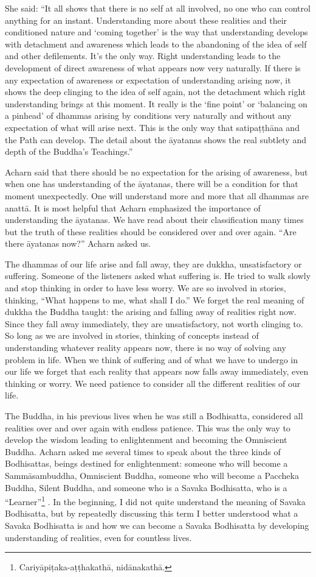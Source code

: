 She said: ``It all shows that there is no self at all involved, no one
who can control anything for an instant. Understanding more about these
realities and their conditioned nature and `coming together' is the way
that understanding develops with detachment and awareness which leads to
the abandoning of the idea of self and other defilements. It's the only
way. Right understanding leads to the development of direct awareness of
what appears now very naturally. If there is any expectation of
awareness or expectation of understanding arising now, it shows the deep
clinging to the idea of self again, not the detachment which right
understanding brings at this moment. It really is the `fine point' or
`balancing on a pinhead' of dhammas arising by conditions very naturally
and without any expectation of what will arise next. This is the only
way that satipaṭṭhāna and the Path can develop. The detail about the
āyatanas shows the real subtlety and depth of the Buddha's Teachings.''

Acharn said that there should be no expectation for the arising of
awareness, but when one has understanding of the āyatanas, there will be
a condition for that moment unexpectedly. One will understand more and
more that all dhammas are anattā. It is most helpful that Acharn
emphasized the importance of understanding the āyatanas. We have read
about their classification many times but the truth of these realities
should be considered over and over again. ``Are there āyatanas now?''
Acharn asked us.

The dhammas of our life arise and fall away, they are dukkha,
unsatisfactory or suffering. Someone of the listeners asked what
suffering is. He tried to walk slowly and stop thinking in order to have
less worry. We are so involved in stories, thinking, ``What happens to
me, what shall I do.'' We forget the real meaning of dukkha the Buddha
taught: the arising and falling away of realities right now. Since they
fall away immediately, they are unsatisfactory, not worth clinging to.
So long as we are involved in stories, thinking of concepts instead of
understanding whatever reality appears now, there is no way of solving
any problem in life. When we think of suffering and of what we have to
undergo in our life we forget that each reality that appears now falls
away immediately, even thinking or worry. We need patience to consider
all the different realities of our life.

The Buddha, in his previous lives when he was still a Bodhisatta,
considered all realities over and over again with endless patience. This
was the only way to develop the wisdom leading to enlightenment and
becoming the Omniscient Buddha. Acharn asked me several times to speak
about the three kinds of Bodhisattas, beings destined for enlightenment:
someone who will become a Sammāsambuddha, Omniscient Buddha, someone who
will become a Paccheka Buddha, Silent Buddha, and someone who is a
Savaka Bodhisatta, who is a ``Learner''\footnote{Cariyāpiṭaka-aṭṭhakathā,
nidānakathā.} . In the beginning, I did
not quite understand the meaning of Savaka Bodhisatta, but by repeatedly
discussing this term I better understood what a Savaka Bodhisatta is and
how we can become a Savaka Bodhisatta by developing understanding of
realities, even for countless lives.


